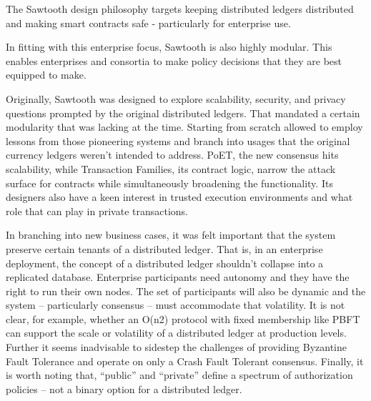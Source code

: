 The Sawtooth design philosophy targets keeping distributed ledgers distributed and making smart contracts safe - particularly for enterprise use.

In fitting with this enterprise focus, Sawtooth is also highly modular. This enables enterprises and consortia to make policy decisions that they are best equipped to make.

Originally, Sawtooth was designed to explore scalability, security, and privacy questions prompted by the original distributed ledgers. That mandated a certain modularity that was lacking at the time. Starting from scratch allowed to employ lessons from those pioneering systems and branch into usages that the original currency ledgers weren't intended to address. PoET, the new consensus hits scalability, while Transaction Families, its contract logic, narrow the attack surface for contracts while simultaneously broadening the functionality. Its designers also have a keen interest in trusted execution environments and what role that can play in private transactions.

In branching into new business cases, it was felt important that the system preserve certain tenants of a distributed ledger. That is, in an enterprise deployment, the concept of a distributed ledger shouldn't collapse into a replicated database. Enterprise participants need autonomy and they have the right to run their own nodes. The set of participants will also be dynamic and the system – particularly consensus – must accommodate that volatility. It is not clear, for example, whether an O(n2) protocol with fixed membership like PBFT can support the scale or volatility of a distributed ledger at production levels. Further it seems inadvisable to sidestep the challenges of providing Byzantine Fault Tolerance and operate on only a Crash Fault Tolerant consensus. Finally, it is worth noting that, “public” and “private” define a spectrum of authorization policies – not a binary option for a distributed ledger.
